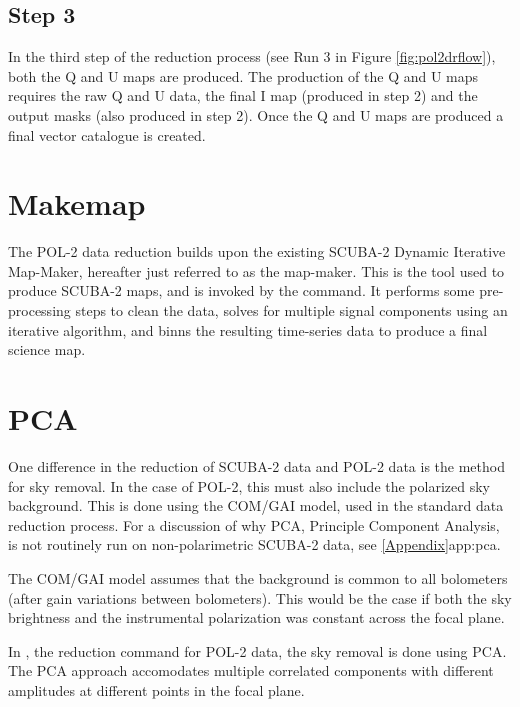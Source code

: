 \subsection*{Step 3}

In the third step of the reduction process (see Run 3 in Figure
\ref{fig:pol2drflow}), both the Q and U maps are produced. The production
of the Q and U maps requires the raw Q and U data, the final I map
(produced in step 2) and the output masks (also produced in step 2). Once
the Q and U maps are produced a final vector catalogue is created.

\section{Makemap}

The POL-2 data reduction builds upon the existing SCUBA-2 Dynamic
Iterative Map-Maker, hereafter just referred to as the map-maker. This
is the tool used to produce SCUBA-2 maps, and is invoked by the
 command. It performs some
pre-processing steps to clean the data, solves for multiple signal
components using an iterative algorithm, and binns the resulting
time-series data to produce a final science map.




\section{PCA}

One difference in the reduction of SCUBA-2 data and POL-2 data is the
method for sky removal.  In the case of POL-2, this must also include
the polarized sky background.  This is done using the COM/GAI model,
used in the standard data reduction process.  For a discussion of why
PCA, Principle Component Analysis, is not routinely run on
non-polarimetric SCUBA-2 data, see \cref{Appendix}{app:pca}{}.

The COM/GAI model assumes that the background is common to all
bolometers (after gain variations between bolometers). This would be
the case if both the sky brightness and the instrumental polarization
was constant across the focal plane.

In , the reduction command for
POL-2 data, the sky removal is done using PCA.  The PCA approach
accomodates multiple correlated components with different amplitudes
at different points in the focal plane.




